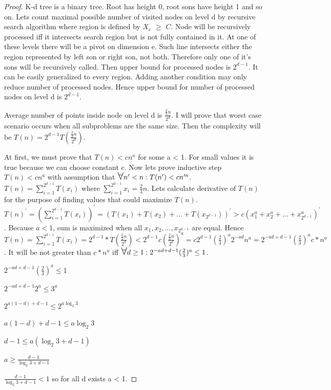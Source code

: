\documentclass[10pt,a4paper]{article}
\newcommand\bigforall{\mbox{\Large $\mathsurround0pt\forall$}}
\begin{document}
\begin{proof}

K-d tree is a binary tree. Root has height 0, root sons have height 1 and so on. Lets count maximal possible number of visited nodes on level d by recursive search algorithm where region is defined by $X_e$ $\geq$ $C$. Node will be recursively processed iff it intersects search region but is not fully contained in it. At one of these levels there will be a pivot on dimension e. Such line intersects either the region represented by left son or right son, not both. Therefore only one of it's sons will be recursively called. Then upper bound for processed nodes is $2^{d-1}$. It can be easily generalized to every region. Adding another condition may only reduce number of processed nodes. Hence upper bound for number of processed nodes on level d is $2^{d-1}$. 

Average number of points inside node on level d is $\frac{\frac{2}{3}n}{2^d}$. I will prove that worst case scenario occurs when all subproblems are the same size. Then the complexity will be $T(n)=2^{d-1}T(\frac{\frac{2}{3}n}{2^d})$.

At first, we must prove that $T(n) < c n^a$ for some a < 1. For small values it is true because we can choose constant c. Now lets prove inductive step $T(n) < c n^a$ with assumption that $\bigforall n' < n: T(n') < c n'^a$. $T(n) = \displaystyle\sum\limits_{i=1}^{2^{d-1}} T(x_i)$  where $ \displaystyle\sum\limits_{i=1}^{2^{d-1}} x_i = \frac{2}{3}n$. Lets calculate derivative of $T(n)$ for the purpose of finding values that could maximize $T(n)$.  $T(n)^\prime = ( \displaystyle\sum\limits_{i=1}^{2^{d-1}} T(x_i))^\prime = (T(x_1) + T(x_2) + ... + T(x_{2^{d-1}}))^\prime > c (x_1^a + x_2^a + ... + x_{2^{d-1}}^a)^\prime$. Because $a<1$, sum is maximized when all $x_1, x_2, ..., x_{2^{d-1}}$ are equal. Hence $T(n) = \displaystyle\sum\limits_{i=1}^{2^{d-1}} T(x_i) = 2^{d-1} * T(\frac{\frac{2}{3}n}{2^d}) < 2^{d-1} c (\frac{\frac{2}{3}n}{2^d}) ^ a = c 2^{d-1} (\frac{2}{3})^a 2^{-ad} n^a = 2^{-ad+d-1} (\frac{2}{3})^a c * n^a$. It will be not greater than $c * n^a$ iff $\bigforall d\geq1: 2^{-ad+d-1} (\frac{2}{3})^a \leq 1$.
\bigskip

$2^{-ad+d-1} (\frac{2}{3})^a \leq 1$

$2^{-ad+d-1} 2^a \leq 3^a$

$2^{a(1-d)+d-1} \leq 2^{a \log_2{3}}$

$a(1-d)+d-1 \leq a \log_2{3}$

$d-1 \leq a (\log_2{3} + d -1)$

$a \geq \frac{d-1}{\log_2{3} + d -1} $

$\frac{d-1}{\log_2{3} + d -1} < 1$ so for all d exists a < 1.

\end{proof}
\end{document}

